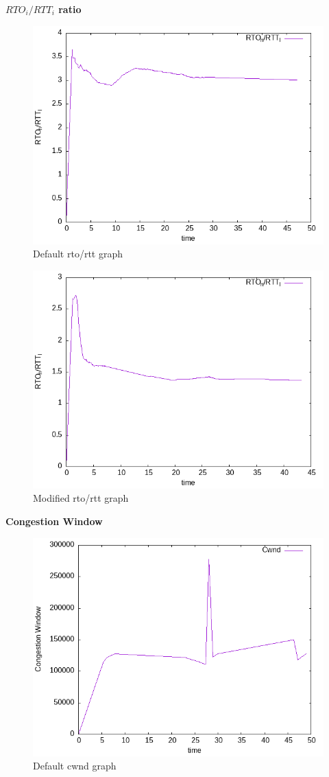 \documentclass{article}[12pt]
\begin{document}
\newpage
\textbf{$RTO_i/RTT_i $ ratio}
\begin{figure}[H]
	\centering
	\includegraphics[height=0.6\textwidth]{Pictures/rtt/130/b/rto_by_rtt.png}
	\caption{Default rto/rtt graph}
\end{figure}   

\begin{figure}[H]
	\centering
	\includegraphics[height=0.6\textwidth]{Pictures/rtt/130/m/rto_by_rtt.png}
	\caption{Modified rto/rtt graph}
\end{figure}   

\newpage
\textbf{Congestion Window}
\begin{figure}[H]
	\centering
	\includegraphics[height=0.6\textwidth]{Pictures/rtt/130/b/cwnd_graph.png}
	\caption{Default cwnd graph}
\end{figure}   
\end{document}
